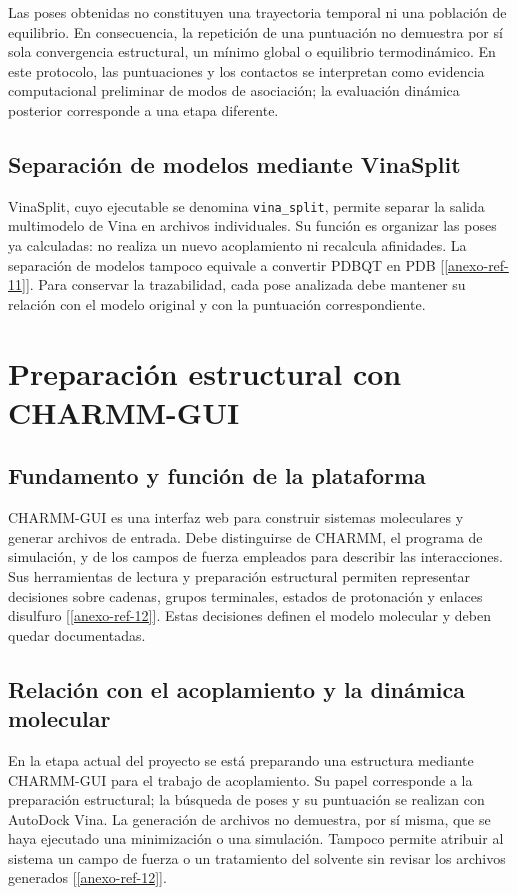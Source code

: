 Las poses obtenidas no constituyen una trayectoria temporal ni una población de equilibrio. En consecuencia, la repetición de una puntuación no demuestra por sí sola convergencia estructural, un mínimo global o equilibrio termodinámico. En este protocolo, las puntuaciones y los contactos se interpretan como evidencia computacional preliminar de modos de asociación; la evaluación dinámica posterior corresponde a una etapa diferente.

\section{Separación de modelos mediante VinaSplit}
VinaSplit, cuyo ejecutable se denomina \texttt{vina\_split}, permite separar la salida multimodelo de Vina en archivos individuales. Su función es organizar las poses ya calculadas: no realiza un nuevo acoplamiento ni recalcula afinidades. La separación de modelos tampoco equivale a convertir PDBQT en PDB [\ref{anexo-ref-11}]. Para conservar la trazabilidad, cada pose analizada debe mantener su relación con el modelo original y con la puntuación correspondiente.

\chapter{Preparación estructural con CHARMM-GUI}
\label{ap:charmm-gui}

\section{Fundamento y función de la plataforma}
CHARMM-GUI es una interfaz web para construir sistemas moleculares y generar archivos de entrada. Debe distinguirse de CHARMM, el programa de simulación, y de los campos de fuerza empleados para describir las interacciones. Sus herramientas de lectura y preparación estructural permiten representar decisiones sobre cadenas, grupos terminales, estados de protonación y enlaces disulfuro [\ref{anexo-ref-12}]. Estas decisiones definen el modelo molecular y deben quedar documentadas.

\section{Relación con el acoplamiento y la dinámica molecular}
En la etapa actual del proyecto se está preparando una estructura mediante CHARMM-GUI para el trabajo de acoplamiento. Su papel corresponde a la preparación estructural; la búsqueda de poses y su puntuación se realizan con AutoDock Vina. La generación de archivos no demuestra, por sí misma, que se haya ejecutado una minimización o una simulación. Tampoco permite atribuir al sistema un campo de fuerza o un tratamiento del solvente sin revisar los archivos generados [\ref{anexo-ref-12}].

